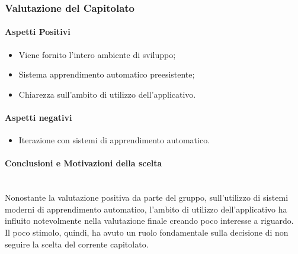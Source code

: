 \subsubsection{Valutazione del Capitolato}

\paragraph{Aspetti Positivi}
\begin{itemize}
	\item Viene fornito l'intero ambiente di sviluppo;
	\item Sistema apprendimento automatico preesistente;
	\item Chiarezza sull'ambito di utilizzo dell'applicativo.
\end{itemize}

\paragraph{Aspetti negativi}
\begin{itemize}
	\item Iterazione con sistemi di apprendimento automatico.
\end{itemize}

\paragraph{Conclusioni e Motivazioni della scelta} \-\\
Nonostante la valutazione positiva da parte del gruppo, sull'utilizzo di sistemi moderni di apprendimento automatico, l'ambito di utilizzo dell'applicativo ha influito notevolmente nella valutazione finale creando poco interesse a riguardo.\\
Il poco stimolo, quindi, ha avuto un ruolo fondamentale sulla decisione di non seguire la scelta del corrente capitolato.